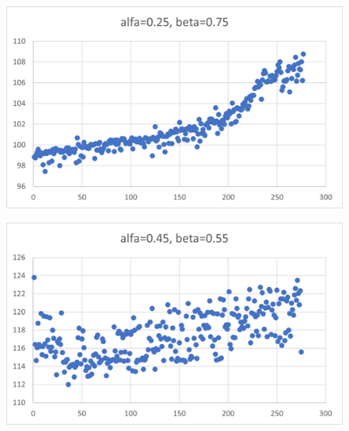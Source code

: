 \documentclass[12pt]{mwart}
\begin{document}
	\begin{figure}[H]
		\centering
		\includegraphics{100_a0.25.png}
	\end{figure}
	\begin{figure}[H]
		\centering
		\includegraphics{100_a0.45.png}
	\end{figure}
\end{document}
